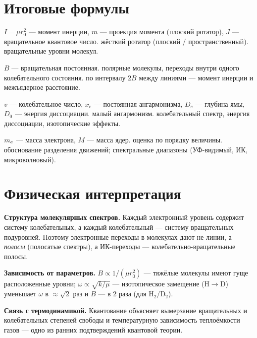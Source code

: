 \section{Итоговые формулы}

 {$I=\mu r_0^2$ — момент инерции, $m$ — проекция момента (плоский ротатор), $J$ — вращательное квантовое число.}
 {жёсткий ротатор (плоский / пространственный).}
 {вращательные уровни молекул.}

 {$B$ — вращательная постоянная.}
 {полярные молекулы, переходы внутри одного колебательного состояния.}
 {по интервалу $2B$ между линиями — момент инерции и межъядерное расстояние.}

 {$v$ — колебательное число, $x_e$ — постоянная ангармонизма, $D_e$ — глубина ямы, $D_0$ — энергия диссоциации.}
 {малый ангармонизм.}
 {колебательный спектр, энергия диссоциации, изотопические эффекты.}

 {$m_e$ — масса электрона, $M$ — масса ядер.}
 {оценка по порядку величины.}
 {обоснование разделения движений; спектральные диапазоны (УФ-видимый, ИК, микроволновый).}

\section{Физическая интерпретация}

\textbf{Структура молекулярных спектров.} Каждый электронный уровень содержит систему колебательных,
а каждый колебательный — систему вращательных подуровней. Поэтому электронные переходы в молекулах
дают не линии, а \emph{полосы} (полосатые спектры), а ИК-переходы — колебательно-вращательные полосы.

\textbf{Зависимость от параметров.} $B\propto1/(\mu r_0^2)$ — тяжёлые молекулы имеют гуще расположенные
уровни; $\omega\propto\sqrt{k/\mu}$ — изотопическое замещение (H$\to$D) уменьшает $\omega$ в $\approx\sqrt2$ раз
и $B$ — в 2 раза (для H$_2$/D$_2$).

\textbf{Связь с термодинамикой.} Квантование объясняет вымерзание вращательных и колебательных
степеней свободы и температурную зависимость теплоёмкости газов — одно из ранних подтверждений
квантовой теории.

